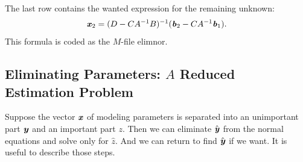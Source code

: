 The last row contains the wanted expression for the remaining unknown:
\begin{align}
\textbf{\textit{x}}_{2} = (D-CA^{-1}B)^{-1}(\textbf{\textit{b}}_{2} - CA^{-1}\textbf{\textit{b}}_{1}).
\end{align}
This formula is coded as the $M$-file elimnor.

\subsection{Eliminating Parameters: $A$ Reduced Estimation Problem}

\begin{flushleft}
	Suppose the vector $\textbf{\textit{x}}$ of modeling parameters is separated into an unimportant part $\textbf{\textit{y}}$ and an important part $z$. Then we can eliminate $\hat{\textbf{\textit{y}}}$ from the normal equations and solve only for $\hat{z}$. And we can return to find $\hat{\textbf{\textit{y}}}$ if we want. It is useful to describe those steps.
\end{flushleft}

